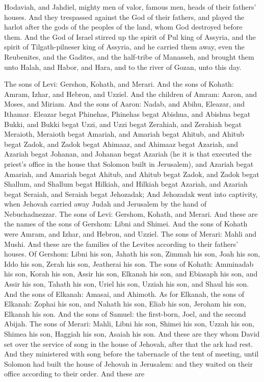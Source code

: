 Hodaviah, and Jahdiel, mighty men of valor, famous men, heads of their fathers’ houses.  And they trespassed against the God of their fathers, and played the harlot after the gods of the peoples of the land, whom God destroyed before them. And the God of Israel stirred up the spirit of Pul king of Assyria, and the spirit of Tilgath-pilneser king of Assyria, and he carried them away, even the Reubenites, and the Gadites, and the half-tribe of Manasseh, and brought them unto Halah, and Habor, and Hara, and to the river of Gozan, unto this day. 

The sons of Levi: Gershon, Kohath, and Merari. And the sons of Kohath: Amram, Izhar, and Hebron, and Uzziel. And the children of Amram: Aaron, and Moses, and Miriam. And the sons of Aaron: Nadab, and Abihu, Eleazar, and Ithamar. Eleazar begat Phinehas, Phinehas begat Abishua, and Abishua begat Bukki, and Bukki begat Uzzi, and Uzzi begat Zerahiah, and Zerahiah begat Meraioth, Meraioth begat Amariah, and Amariah begat Ahitub, and Ahitub begat Zadok, and Zadok begat Ahimaaz, and Ahimaaz begat Azariah, and Azariah begat Johanan, and Johanan begat Azariah (he it is that executed the priest’s office in the house that Solomon built in Jerusalem), and Azariah begat Amariah, and Amariah begat Ahitub, and Ahitub begat Zadok, and Zadok begat Shallum, and Shallum begat Hilkiah, and Hilkiah begat Azariah, and Azariah begat Seraiah, and Seraiah begat Jehozadak; And Jehozadak went into captivity, when Jehovah carried away Judah and Jerusalem by the hand of Nebuchadnezzar.  The sons of Levi: Gershom, Kohath, and Merari. And these are the names of the sons of Gershom: Libni and Shimei. And the sons of Kohath were Amram, and Izhar, and Hebron, and Uzziel. The sons of Merari: Mahli and Mushi. And these are the families of the Levites according to their fathers’ houses. Of Gershom: Libni his son, Jahath his son, Zimmah his son, Joah his son, Iddo his son, Zerah his son, Jeatherai his son. The sons of Kohath: Amminadab his son, Korah his son, Assir his son, Elkanah his son, and Ebiasaph his son, and Assir his son, Tahath his son, Uriel his son, Uzziah his son, and Shaul his son. And the sons of Elkanah: Amasai, and Ahimoth. As for Elkanah, the sons of Elkanah: Zophai his son, and Nahath his son, Eliab his son, Jeroham his son, Elkanah his son. And the sons of Samuel: the first-born, Joel, and the second Abijah. The sons of Merari: Mahli, Libni his son, Shimei his son, Uzzah his son, Shimea his son, Haggiah his son, Asaiah his son.  And these are they whom David set over the service of song in the house of Jehovah, after that the ark had rest. And they ministered with song before the tabernacle of the tent of meeting, until Solomon had built the house of Jehovah in Jerusalem: and they waited on their office according to their order. And these are 